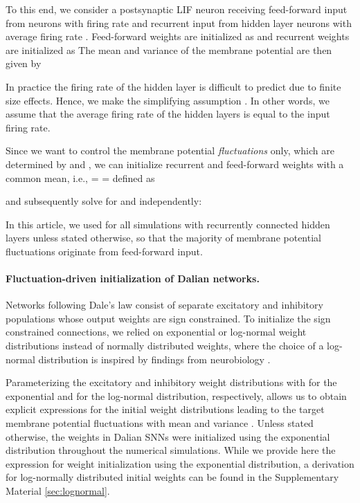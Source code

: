 \documentclass[11pt,a4paper]{article}
\begin{document}
To this end, we consider a postsynaptic LIF neuron receiving
feed-forward input from  neurons with firing rate  and recurrent
input from  hidden layer neurons with average firing rate .
Feed-forward weights are initialized as 
and recurrent weights are initialized as  The mean  and variance  of the membrane
potential are then given by

In practice the firing rate  of the hidden layer is
difficult to predict due to finite size effects. 
Hence, we make the simplifying assumption . In other words, we assume that the average
firing rate of the hidden layers is equal to the input firing rate.


Since we want  to control the membrane potential \textit{fluctuations}
only, which are determined by  and , we can initialize
recurrent and feed-forward weights with a common mean, i.e.,  =
 = 
defined as

and subsequently solve for  and  independently:

In this article, we used  for all simulations with recurrently connected
hidden layers unless stated otherwise, so that the majority of membrane potential fluctuations originate from
feed-forward input.
  
\paragraph{Fluctuation-driven initialization of Dalian networks.} Networks
following Dale's law consist of separate excitatory and inhibitory populations whose output weights are sign constrained.
To initialize the sign constrained connections, we relied on exponential or log-normal weight distributions instead of normally distributed weights, where the choice of a log-normal distribution is inspired by
findings from neurobiology \citep{buzsaki_log-dynamic_2014}.

Parameterizing the excitatory and inhibitory weight distributions with  for the exponential and  for the log-normal distribution, respectively, allows us to obtain explicit expressions for the initial weight distributions leading to the target membrane potential fluctuations with mean  and variance . 
Unless stated otherwise, the weights in Dalian \acp{SNN} were initialized using the exponential distribution throughout the numerical simulations. While we provide here the expression for weight initialization using the exponential distribution, a derivation for log-normally distributed initial weights can be found in the Supplementary Material \ref{sec:lognormal}.
\end{document}

